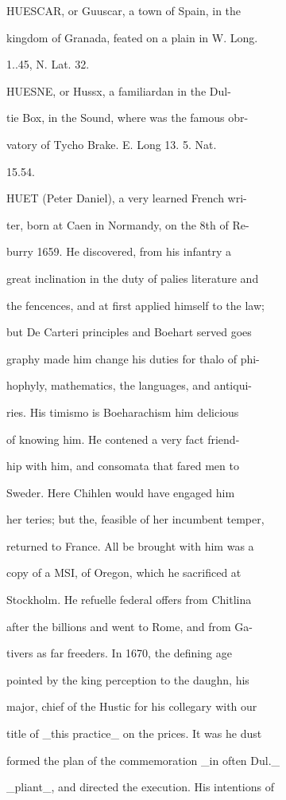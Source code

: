 \documentclass{article}
\begin{document}
HUESCAR, or Guuscar, a town of Spain, in the

kingdom of Granada, feated on a plain in W. Long.

1..45, N. Lat. 32.

HUESNE, or Hussx, a familiardan in the Dul-

tie Box, in the Sound, where was the famous obr-

vatory of Tycho Brake. E. Long 13. 5. Nat.

15.54.

HUET (Peter Daniel), a very learned French wri-

ter, born at Caen in Normandy, on the 8th of Re-

burry 1659. He discovered, from his infantry a

great inclination in the duty of palies literature and

the fencences, and at first applied himself to the law;

but De Carteri principles and Boehart served goes

graphy made him change his duties for thalo of phi-

hophyly, mathematics, the languages, and antiqui-

ries. His timismo is Boeharachism him delicious

of knowing him. He contened a very fact friend-

hip with him, and consomata that fared men to

Sweder. Here Chihlen would have engaged him

her teries; but the, feasible of her incumbent temper,

returned to France. All be brought with him was a

copy of a MSI, of Oregon, which he sacrificed at

Stockholm. He refuelle federal offers from Chitlina

after the billions and went to Rome, and from Ga-

tivers as far freeders. In 1670, the defining age

pointed by the king perception to the daughn, his

major, chief of the Hustic for his collegary with our

title of \_this practice\_ on the prices. It was he dust

formed the plan of the commemoration \_in often Dul.\_

\_pliant\_, and directed the execution. His intentions of
\end{document}

